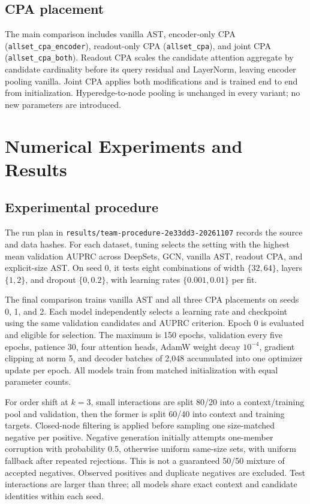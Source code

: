 \documentclass{article}
\begin{document}
\subsection{CPA placement}
The main comparison includes vanilla AST, encoder-only CPA (\texttt{allset\_cpa\_encoder}), readout-only CPA (\texttt{allset\_cpa}), and joint CPA (\texttt{allset\_cpa\_both}). Readout CPA scales the candidate attention aggregate by candidate cardinality before its query residual and LayerNorm, leaving encoder pooling vanilla. Joint CPA applies both modifications and is trained end to end from initialization. Hyperedge-to-node pooling is unchanged in every variant; no new parameters are introduced.

\section{Numerical Experiments and Results}
\subsection{Experimental procedure}
The run plan in \texttt{results/team-procedure-2e33dd3-20261107} records the source and data hashes. For each dataset, tuning selects the setting with the highest mean validation AUPRC across DeepSets, GCN, vanilla AST, readout CPA, and explicit-size AST. On seed 0, it tests eight combinations of width $\{32,64\}$, layers $\{1,2\}$, and dropout $\{0,0.2\}$, with learning rates $\{0.001,0.01\}$ per fit.

The final comparison trains vanilla AST and all three CPA placements on seeds 0, 1, and 2. Each model independently selects a learning rate and checkpoint using the same validation candidates and AUPRC criterion. Epoch 0 is evaluated and eligible for selection. The maximum is 150 epochs, validation every five epochs, patience 30, four attention heads, AdamW weight decay $10^{-4}$, gradient clipping at norm 5, and decoder batches of 2,048 accumulated into one optimizer update per epoch. All models train from matched initialization with equal parameter counts.

For order shift at $k=3$, small interactions are split 80/20 into a context/training pool and validation, then the former is split 60/40 into context and training targets. Closed-node filtering is applied before sampling one size-matched negative per positive. Negative generation initially attempts one-member corruption with probability 0.5, otherwise uniform same-size sets, with uniform fallback after repeated rejections. This is not a guaranteed 50/50 mixture of accepted negatives. Observed positives and duplicate negatives are excluded. Test interactions are larger than three; all models share exact context and candidate identities within each seed.
\end{document}
